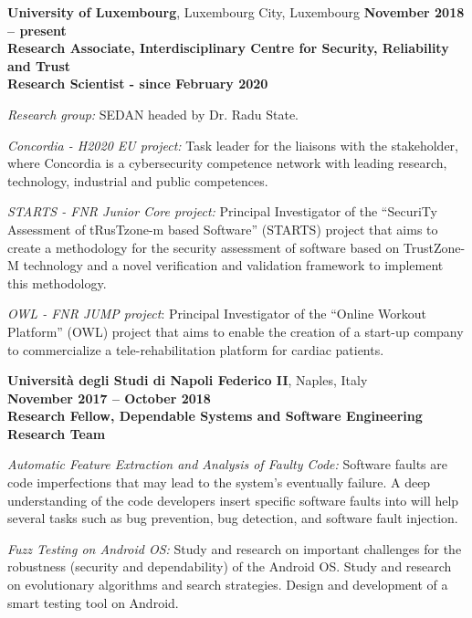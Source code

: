 \documentclass[margin,line]{resume}
\begin{document}
\begin{resume}
\textbf{University of Luxembourg}, Luxembourg City, Luxembourg \hfill \textbf{November 2018 -- present}\\
\textbf{Research Associate, Interdisciplinary Centre for Security, Reliability and Trust}\hfill\\
\textbf{Research Scientist - since February 2020}\hfill  
\vspace{-3mm}\\\vspace{-1mm}
\begin{list2}
	\item \filbreak\textit{Research group:} SEDAN headed by Dr. Radu State.
	\item \filbreak\textit{Concordia - H2020 EU project:} Task leader for the liaisons with the stakeholder, where Concordia is a cybersecurity competence network with leading research, technology, industrial and public competences.
	\item \filbreak\textit{STARTS - FNR Junior Core project:} Principal Investigator of the ``SecuriTy Assessment of tRusTzone-m based Software'' (STARTS) project that aims to create a methodology for the security assessment of software based on TrustZone-M technology and a novel verification and validation framework to implement this methodology. 
	\item \filbreak\textit{OWL - FNR JUMP project}: Principal Investigator of the ``Online Workout Platform'' (OWL) project that aims to enable the creation of a start-up company to commercialize a tele-rehabilitation platform for cardiac patients.
\end{list2}



\textbf{Universit\`a degli Studi di Napoli Federico II}, Naples, Italy\\ \phantom{.} \hfill \textbf{November 2017 -- October 2018}\\
\textbf{Research Fellow, Dependable Systems and Software Engineering Research Team}\hfill 
\vspace{-3mm}\\\vspace{-1mm}
\begin{list2}
	\item \filbreak\textit{Automatic Feature Extraction and Analysis of Faulty Code:} Software faults are code imperfections that may lead to the system's eventually failure. A deep understanding of the code developers insert specific software faults into will help several tasks such as bug prevention, bug detection, and software fault injection.
    \item \filbreak\textit{Fuzz Testing on Android OS:} Study and research on important challenges for the robustness (security and dependability) of the Android OS. Study and research on evolutionary algorithms and search strategies. Design and development of a smart testing tool on Android.
\end{list2}


\end{resume}
\end{document}
